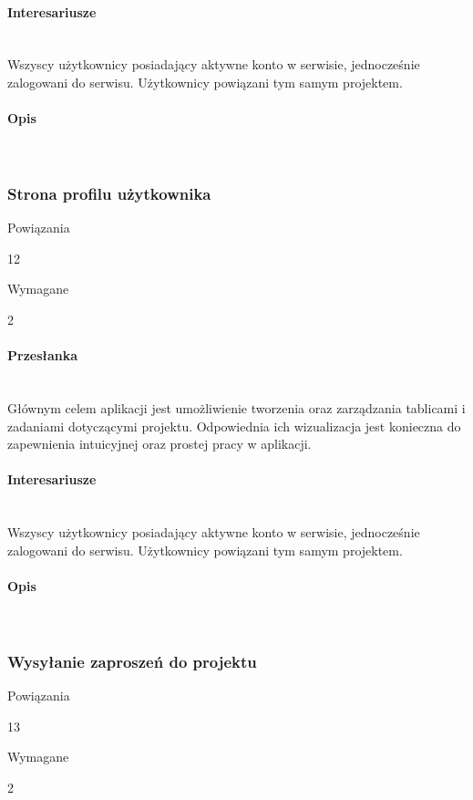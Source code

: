 \documentclass[eng,printmode]{mgr}
\begin{document}
\paragraph{Interesariusze}\ \\
Wszyscy użytkownicy posiadający aktywne konto w serwisie, jednocześnie zalogowani do serwisu. Użytkownicy powiązani tym samym projektem.

\paragraph{Opis}\ \\
\newpage

\subsubsection{Strona profilu użytkownika}
\begin{labeling}{Powiązania}
\item [ID:] 12
\item [Typ:] Wymagane
\item [Powiązania] 2
\end{labeling}

\paragraph{Przesłanka}\ \\
Głównym celem aplikacji jest umożliwienie tworzenia oraz zarządzania tablicami i zadaniami dotyczącymi projektu. Odpowiednia ich wizualizacja jest konieczna do zapewnienia intuicyjnej oraz prostej pracy w aplikacji.

\paragraph{Interesariusze}\ \\
Wszyscy użytkownicy posiadający aktywne konto w serwisie, jednocześnie zalogowani do serwisu. Użytkownicy powiązani tym samym projektem.

\paragraph{Opis}\ \\
\newpage

\subsubsection{Wysyłanie zaproszeń do projektu}
\begin{labeling}{Powiązania}
\item [ID:] 13
\item [Typ:] Wymagane
\item [Powiązania] 2
\end{labeling}
\end{document}
